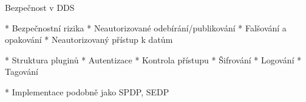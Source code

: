 \sec Bezpečnost v DDS

* Bezpečnostní rizika
\begitems
* Neautorizované odebírání/publikování
* Falšování a opakování
* Neautorizovaný přístup k datům
\enditems

* Struktura pluginů
\begitems
* Autentizace
* Kontrola přístupu
* Šifrování
* Logování
* Tagování
\enditems

* Implementace podobně jako SPDP, SEDP

